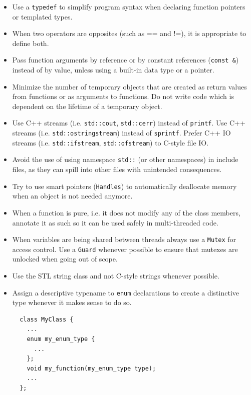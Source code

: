 \documentclass[fleqn,12pt,openany]{book}
\begin{document}
\begin{itemize}
\item
Use a \texttt{typedef} to simplify program syntax when declaring function pointers
or templated types. 

\item
When two operators are opposites (such as == and !=), it is appropriate to define both. 

\item
Pass function arguments by reference or by constant references (\texttt{const \&})
instead of by value, unless using a built-in data type or a pointer. 


\item
Minimize the number of temporary objects that are created as return values from
functions or as arguments to functions. 
Do not write code which is dependent on the lifetime of a temporary object. 

\item
Use C++ streams (i.e. \texttt{std::cout}, \texttt{std::cerr}) instead of \texttt{printf}.
Use C++ streams (i.e. \texttt{std::ostringstream}) instead of \texttt{sprintf}.
Prefer C++ IO streams (i.e. \texttt{std::ifstream}, \texttt{std::ofstream})
to C-style file IO.

\item
Avoid the use of using namespace \texttt{std::} (or other namespaces) in include files,
as they can spill into other files with unintended consequences. 

\item
Try to use smart pointers (\texttt{Handles}) to automatically deallocate memory
when an object is not needed anymore. 

\item
When a function is pure, i.e. it does not modify any of the class members,
annotate it as such so it can be used safely in multi-threaded code. 

\item
When variables are being shared between threads always use a \texttt{Mutex} for access control.
Use a \texttt{Guard} whenever possible to ensure that mutexes are unlocked when
going out of scope.

\item
Use the STL string class and not C-style strings whenever possible. 

\item
Assign a descriptive typename to \texttt{enum} declarations to create a
distinctive type whenever it makes sense to do so.

\begin{verbatim}
  class MyClass {
    ... 
    enum my_enum_type {
      ...
    };
    void my_function(my_enum_type type);
    ...
  };

\end{verbatim}


\end{itemize}
\end{document}
